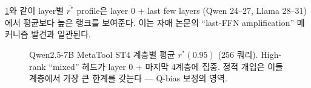 \documentclass{article}
\theoremstyle{definition}
\begin{document}
\cref{fig:layer-profile}와 같이 layer별 $\bar{r^*}$ profile은 layer 0 + last few layers (Qwen 24--27, Llama 28--31)에서 평균보다 높은 랭크를 보여준다. 이는 자매 논문의 ``last-FFN amplification'' 메커니즘 발견과 일관된다.

\begin{figure}[h]
\centering
\caption{Qwen2.5-7B MetaTool ST4 계층별 평균 $r^*(0.95)$ (256 쿼리). High-rank ``mixed'' 헤드가 layer 0 + 마지막 4계층에 집중. 정적 개입은 이들 계층에서 가장 큰 한계를 갖는다 --- Q-bias 보정의 영역.}
\label{fig:layer-profile}
\end{figure}
\end{document}
